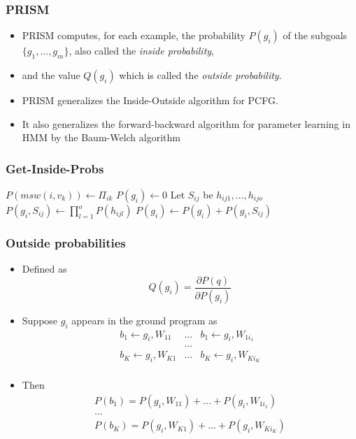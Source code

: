\documentclass[trans,aspectratio=1610]{beamer}
\newcommand{\lpif}{\leftarrow}
\begin{document}
\begin{frame}
  \frametitle{PRISM}
  \begin{itemize}
  \item PRISM  computes, for each example, the probability
$P(g_i)$ 
of the subgoals $\{g_1,\ldots,g_m\}$, also called the \emph{inside probability}, 
\item and the value $Q(g_i)$ which is 
called the
\emph{outside probability}. 
\item  PRISM  generalizes the Inside-Outside algorithm
 for PCFG.
\item  It also generalizes the forward-backward 
 algorithm  for parameter 
learning in HMM by the Baum-Welch algorithm
\end{itemize}
\end{frame}
\begin{frame}
  \frametitle{Get-Inside-Probs}
\begin{algorithmic}[1]
  \State $P(msw(i,v_k))\gets \Pi_{ik}$
\EndFor
{}
  \State   $P(g_i)\gets 0$
    \State Let $S_{ij}$ be $h_{ij1},\ldots,h_{ijo}$
    \State $P(g_i,S_{ij})\gets\prod_{l=1}^{o}P(h_{ijl})$
    \State   $P(g_i)\gets P(g_i)+P(g_i,S_{ij})$  
  \EndFor
\EndFor
\EndProcedure
\end{algorithmic}
\end{frame}
\begin{frame}
  \frametitle{Outside probabilities}
  \begin{itemize}
  \item 
Defined as
$$Q(g_i)=\frac{\partial P(q)}{\partial P(g_i)}$$
\item 
Suppose $g_i$ appears in the  ground program as
$$\begin{array}{ccc}
b_1\lpif g_i, W_{11}& \ldots& b_1\lpif g_i, W_{1i_1}\\
&\ldots&\\
b_K\lpif g_i, W_{K1}& \ldots& b_K\lpif g_i, W_{Ki_K}\\
\end{array}$$
\item Then
$$\begin{array}{c}
P(b_1)=P( g_i, W_{11})+ \ldots+ P(g_i, W_{1i_1})\\
\ldots\\
P(b_K)=P( g_i, W_{K1})+ \ldots+ P(g_i, W_{Ki_K})\\
\end{array}$$
\end{itemize}
\end{frame}
\end{document}
